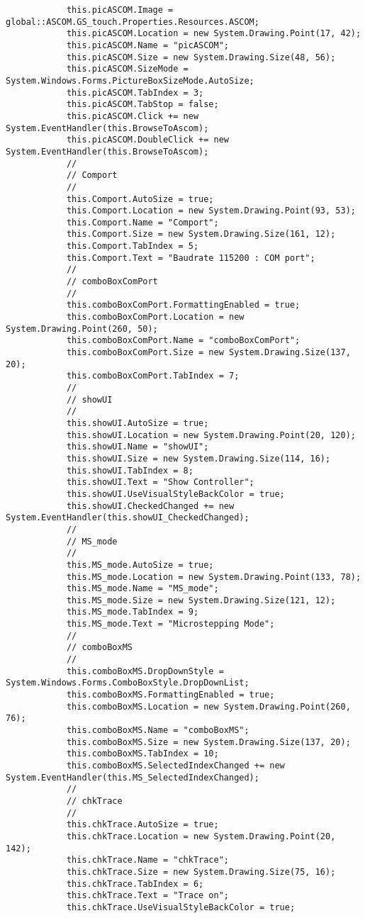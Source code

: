 \begin{lstlisting}
			this.picASCOM.Image = global::ASCOM.GS_touch.Properties.Resources.ASCOM;
			this.picASCOM.Location = new System.Drawing.Point(17, 42);
			this.picASCOM.Name = "picASCOM";
			this.picASCOM.Size = new System.Drawing.Size(48, 56);
			this.picASCOM.SizeMode = System.Windows.Forms.PictureBoxSizeMode.AutoSize;
			this.picASCOM.TabIndex = 3;
			this.picASCOM.TabStop = false;
			this.picASCOM.Click += new System.EventHandler(this.BrowseToAscom);
			this.picASCOM.DoubleClick += new System.EventHandler(this.BrowseToAscom);
			// 
			// Comport
			// 
			this.Comport.AutoSize = true;
			this.Comport.Location = new System.Drawing.Point(93, 53);
			this.Comport.Name = "Comport";
			this.Comport.Size = new System.Drawing.Size(161, 12);
			this.Comport.TabIndex = 5;
			this.Comport.Text = "Baudrate 115200 : COM port";
			// 
			// comboBoxComPort
			// 
			this.comboBoxComPort.FormattingEnabled = true;
			this.comboBoxComPort.Location = new System.Drawing.Point(260, 50);
			this.comboBoxComPort.Name = "comboBoxComPort";
			this.comboBoxComPort.Size = new System.Drawing.Size(137, 20);
			this.comboBoxComPort.TabIndex = 7;
			// 
			// showUI
			// 
			this.showUI.AutoSize = true;
			this.showUI.Location = new System.Drawing.Point(20, 120);
			this.showUI.Name = "showUI";
			this.showUI.Size = new System.Drawing.Size(114, 16);
			this.showUI.TabIndex = 8;
			this.showUI.Text = "Show Controller";
			this.showUI.UseVisualStyleBackColor = true;
			this.showUI.CheckedChanged += new System.EventHandler(this.showUI_CheckedChanged);
			// 
			// MS_mode
			// 
			this.MS_mode.AutoSize = true;
			this.MS_mode.Location = new System.Drawing.Point(133, 78);
			this.MS_mode.Name = "MS_mode";
			this.MS_mode.Size = new System.Drawing.Size(121, 12);
			this.MS_mode.TabIndex = 9;
			this.MS_mode.Text = "Microstepping Mode";
			// 
			// comboBoxMS
			// 
			this.comboBoxMS.DropDownStyle = System.Windows.Forms.ComboBoxStyle.DropDownList;
			this.comboBoxMS.FormattingEnabled = true;
			this.comboBoxMS.Location = new System.Drawing.Point(260, 76);
			this.comboBoxMS.Name = "comboBoxMS";
			this.comboBoxMS.Size = new System.Drawing.Size(137, 20);
			this.comboBoxMS.TabIndex = 10;
			this.comboBoxMS.SelectedIndexChanged += new System.EventHandler(this.MS_SelectedIndexChanged);
			// 
			// chkTrace
			// 
			this.chkTrace.AutoSize = true;
			this.chkTrace.Location = new System.Drawing.Point(20, 142);
			this.chkTrace.Name = "chkTrace";
			this.chkTrace.Size = new System.Drawing.Size(75, 16);
			this.chkTrace.TabIndex = 6;
			this.chkTrace.Text = "Trace on";
			this.chkTrace.UseVisualStyleBackColor = true;

\end{lstlisting}
